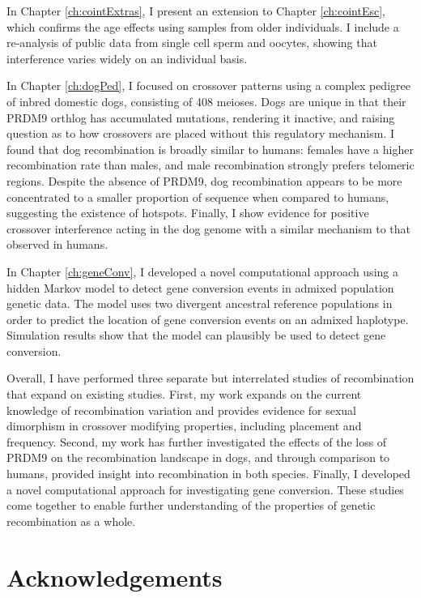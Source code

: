 \documentclass[11pt,twoside,openright,letterpaper]{memoir}
\begin{document}
In Chapter \ref{ch:cointExtras}, I present an extension to Chapter \ref{ch:cointEsc}, which confirms the age effects using samples from older individuals.
I include a re-analysis of public data from single cell sperm and oocytes, showing that interference varies widely on an individual basis.

In Chapter \ref{ch:dogPed}, I focused on crossover patterns using a complex pedigree of inbred domestic dogs, consisting of 408 meioses.
Dogs are unique in that their PRDM9 orthlog has accumulated mutations, rendering it inactive, and raising question as to how crossovers are placed without this regulatory mechanism.
I found that dog recombination is broadly similar to humans: females have a higher recombination rate than males, and male recombination strongly prefers telomeric regions.
Despite the absence of PRDM9, dog recombination appears to be more concentrated to a smaller proportion of sequence when compared to humans, suggesting the existence of hotspots.
Finally, I show evidence for positive crossover interference acting in the dog genome with a similar mechanism to that observed in humans.

In Chapter \ref{ch:geneConv}, I developed a novel computational approach using a hidden Markov model to detect gene conversion events in admixed population genetic data.
The model uses two divergent ancestral reference populations in order to predict the location of gene conversion events on an admixed haplotype.
Simulation results show that the model can plausibly be used to detect gene conversion.

Overall, I have performed three separate but interrelated studies of recombination that expand on existing studies.
First, my work expands on the current knowledge of recombination variation and provides evidence for sexual dimorphism in crossover modifying properties, including placement and frequency.
Second, my work has further investigated the effects of the loss of PRDM9 on the recombination landscape in dogs, and through comparison to humans, provided insight into recombination in both species.
Finally, I developed a novel computational approach for investigating gene conversion.
These studies come together to enable further understanding of the properties of genetic recombination as a whole.



\chapter{Acknowledgements}
\end{document}

